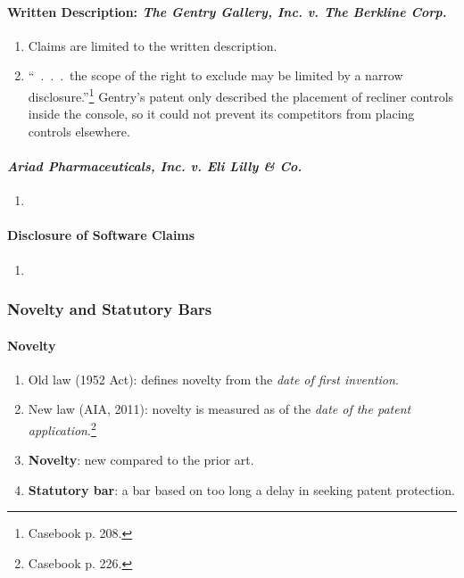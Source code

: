 \paragraph{Written Description: \emph{The Gentry Gallery, Inc. v. 
The Berkline Corp.}}

\begin{enumerate}
    \item Claims are limited to the written description.
    \item ``~.~.~.~the scope of the right to exclude may be limited by a 
    narrow disclosure.''\footnote{Casebook p. 208.} Gentry's patent only 
    described the placement of recliner controls inside the console, so it 
    could not prevent its competitors from placing controls elsewhere.
\end{enumerate}

\paragraph{\emph{Ariad Pharmaceuticals, Inc. v. Eli Lilly \& Co.}} %

\begin{enumerate}
    \item 
\end{enumerate}

\paragraph{Disclosure of Software Claims} %

\begin{enumerate}
    \item 
\end{enumerate}

\subsubsection{Novelty and Statutory Bars}

\paragraph{Novelty}

\begin{enumerate}
    \item Old law (1952 Act): defines novelty from the \emph{date of first 
    invention}.
    \item New law (AIA, 2011): novelty is measured as of the \emph{date of the 
    patent application}.\footnote{Casebook p. 226.}
    \item \textbf{Novelty}: new compared to the prior art.
    \item \textbf{Statutory bar}: a bar based on too long a delay in seeking 
    patent protection.
\end{enumerate}

